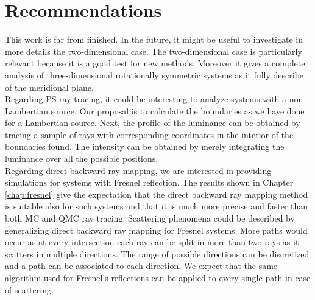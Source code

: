 \section{Recommendations}
This work is far from finished. In the future, it might be useful to investigate in more details the two-dimensional case. The two-dimensional case is particularly relevant because it is a good test for new methods. Moreover it gives a complete analysis of three-dimensional rotationally symmetric systems as it fully describe of the meridional plane.\\ \indent 
Regarding PS ray tracing, it could be interesting to analyze systems with a non-Lambertian source. Our proposal is to calculate the boundaries as we have done for a Lambertian source. Next, the profile of the luminance can be obtained by tracing a sample of rays with corresponding coordinates in the interior of the boundaries found. The intensity can be obtained by merely integrating the luminance over all the possible positions. \\ \indent 
Regarding direct backward ray mapping, we are interested in providing simulations for systems with Fresnel reflection. The results shown in Chapter \ref{chap:fresnel} give the expectation that the direct backward ray mapping method is suitable also for such systems and that it is much more precise and faster than both MC and QMC ray tracing. Scattering phenomena could be described by generalizing direct backward ray mapping for Fresnel systems. More paths would occur as at every intersection each ray can be split in more than two rays as it scatters in multiple directions. The range of possible directions can be discretized and a path can be associated to each direction. We expect that the same algorithm used for Fresnel's reflections can be applied to every single path in case of scattering.
